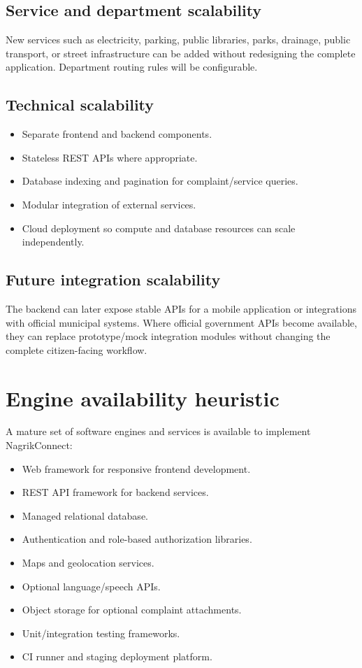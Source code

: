 \documentclass[11pt,a4paper]{article}
\begin{document}
\subsection{Service and department scalability}
New services such as electricity, parking, public libraries, parks, drainage, public transport, or street infrastructure can be added without redesigning the complete application. Department routing rules will be configurable.

\subsection{Technical scalability}
\begin{itemize}[leftmargin=0.7cm]
    \item Separate frontend and backend components.
    \item Stateless REST APIs where appropriate.
    \item Database indexing and pagination for complaint/service queries.
    \item Modular integration of external services.
    \item Cloud deployment so compute and database resources can scale independently.
\end{itemize}

\subsection{Future integration scalability}
The backend can later expose stable APIs for a mobile application or integrations with official municipal systems. Where official government APIs become available, they can replace prototype/mock integration modules without changing the complete citizen-facing workflow.

\section{Engine availability heuristic}
A mature set of software engines and services is available to implement NagrikConnect:
\begin{itemize}[leftmargin=0.7cm]
    \item Web framework for responsive frontend development.
    \item REST API framework for backend services.
    \item Managed relational database.
    \item Authentication and role-based authorization libraries.
    \item Maps and geolocation services.
    \item Optional language/speech APIs.
    \item Object storage for optional complaint attachments.
    \item Unit/integration testing frameworks.
    \item CI runner and staging deployment platform.
\end{itemize}
\end{document}
